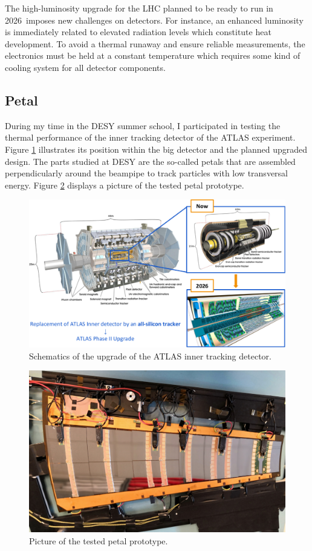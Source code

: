 The high-luminosity upgrade for the LHC planned to be ready to run in 2026\ imposes new challenges on detectors. For instance, an enhanced luminosity is immediately related to elevated radiation levels which constitute heat development. To avoid a thermal runaway and ensure reliable measurements, the electronics must be held at a constant temperature which requires some kind of cooling system for all detector components. \\

\subsection{Petal}
During my time in the DESY summer school, I participated in testing the thermal performance of the inner tracking detector of the ATLAS experiment. Figure \ref{fig:ATLAS} illustrates its position within the big detector and the planned upgraded design. The parts studied at DESY are the so-called petals that are assembled perpendicularly around the beampipe to track particles with low transversal energy. Figure \ref{fig:petal} displays a picture of the tested petal prototype.
\begin{figure}[h!]
	\includegraphics[width=\textwidth]{img/ATLAS.pdf}
	\caption{Schematics of the upgrade of the ATLAS inner tracking detector.}
\label{fig:ATLAS}
\end{figure}
\begin{figure}[h!]
	\includegraphics[width=\textwidth]{img/petal.jpg}
	\caption{Picture of the tested petal prototype.}
	\label{fig:petal}
\end{figure}
